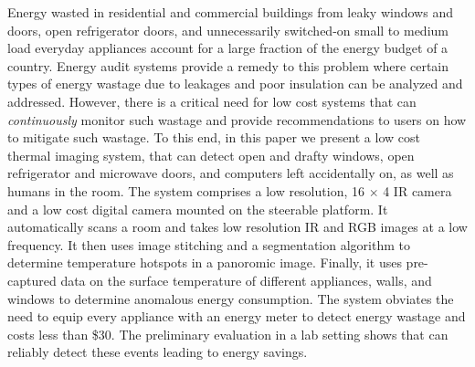 Energy wasted in residential and commercial buildings from leaky windows and doors, open refrigerator doors, and unnecessarily switched-on small to medium load everyday appliances account for a large fraction of the energy budget of a country. Energy audit systems provide a remedy to this problem where certain types of energy wastage due to leakages and poor insulation can be analyzed and addressed. However, there is a critical need for low cost systems that can {\em continuously} monitor such wastage and provide recommendations to users on how to mitigate such wastage. To this end, in this paper we present a low cost thermal imaging system, {\IRLeak} that can detect open and drafty windows, open refrigerator and microwave doors, and computers left accidentally on, as well as humans in the room. The system comprises a low resolution, 16 $\times$ 4 IR camera and a low cost digital camera mounted on the steerable platform. It automatically scans a room and takes low resolution IR and RGB images at a low frequency. It then uses image stitching and a segmentation algorithm to determine temperature hotspots in a panoromic image. Finally, it uses pre-captured data on the surface temperature of different appliances, walls, and windows to determine anomalous energy consumption. The system obviates the need to equip every appliance with an energy meter to detect energy wastage and costs less than \$30. The preliminary evaluation in a lab setting shows that {\IRLeak} can reliably detect these events leading to energy savings.

